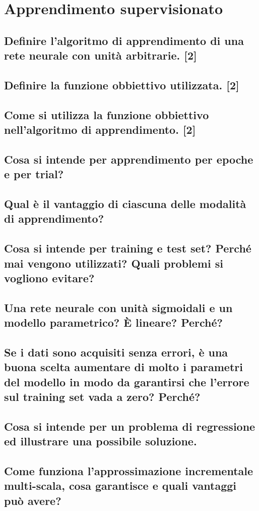 \documentclass[\main/main.tex]{subfiles}
\begin{document}
\section{Apprendimento supervisionato}

\subsection{Definire l'algoritmo di apprendimento di una rete neurale con unità arbitrarie. [2]}
\subsection{Definire la funzione obbiettivo utilizzata. [2]}
\subsection{Come si utilizza la funzione obbiettivo nell'algoritmo di apprendimento. [2]}
\subsection{Cosa si intende per apprendimento per epoche e per trial?}
\subsection{Qual è il vantaggio di ciascuna delle modalità di apprendimento?}
\subsection{Cosa si intende per training e test set? Perché mai vengono utilizzati? Quali problemi si vogliono evitare?}
\subsection{Una rete neurale con unità sigmoidali e un modello parametrico? È lineare? Perché?}
\subsection{Se i dati sono acquisiti senza errori, è una buona scelta aumentare di molto i parametri del modello in modo da garantirsi che l'errore sul training set vada a zero? Perché?}
\subsection{Cosa si intende per un problema di regressione ed illustrare una possibile soluzione.}
\subsection{Come funziona l'approssimazione incrementale multi-scala, cosa garantisce e quali vantaggi può avere?}
\end{document}

